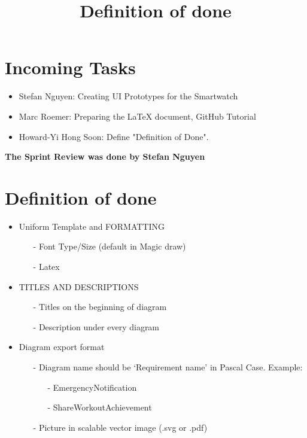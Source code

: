 \documentclass{article}
\begin{document}
\section*{Incoming Tasks}
\begin{itemize}
    \item Stefan Nguyen: Creating UI Prototypes for the Smartwatch
    \item Marc Roemer: Preparing the LaTeX document, GitHub Tutorial
    \item Howard-Yi Hong Soon: Define "Definition of Done".
\end{itemize}
\noindent
\textbf{The Sprint Review was done by Stefan Nguyen}
\newpage

\section{Definition of done}
\title{Definition of done}
\begin{itemize}
\item
  Uniform Template and FORMATTING
  \begin{itemize} 
	\item[-]Font Type/Size (default in Magic draw)
	\item[-]Latex
	\end{itemize}
\end{itemize}

\begin{itemize}
\item
  TITLES AND DESCRIPTIONS
 	\begin{itemize} 
 	\item[-]Titles on the beginning of diagram
  	\item[-] Description under every diagram
	\end{itemize}
\end{itemize}

\begin{itemize}
\item
  Diagram export format
  \begin{itemize}
	\item[-] Diagram name should be ‘Requirement name’ in Pascal Case. Example:
		\begin{itemize}
			\item[-] EmergencyNotification
			\item[-] ShareWorkoutAchievement
		\end{itemize}
	\item[-]Picture in scalable vector image (.svg or .pdf)
	\end{itemize}
\end{itemize}
\end{document}
